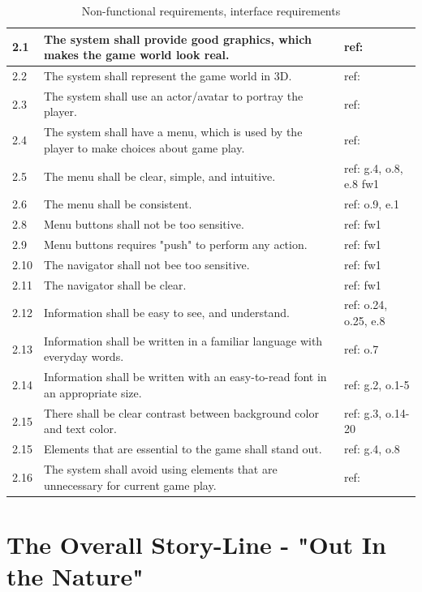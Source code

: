\begin{table} [H]
\centering
\begin{tabular}{|>{\raggedright}p{}|p{}|p{2cm}|} 
\hline
2.1 & The system shall provide good graphics, which makes the game world look real. & ref: \cite{understandingvg} \\ \hline
2.2 & The system shall represent the game world in 3D. & ref: \cite{understandingvg}\\ \hline
2.3 & The system shall use an actor/avatar to portray the player. & ref: \cite{understandingvg}\\ \hline
2.4 & The system shall have a menu, which is used by the player to make choices about game play. & ref: \cite{gerling2} \\ \hline
2.5 & The menu shall be clear, simple, and intuitive. & ref: g.4, o.8, e.8 fw1 \\ \hline
2.6 & The menu shall be consistent. & ref: o.9, e.1 \\ \hline
2.8 & Menu buttons shall not be too sensitive. & ref: fw1 \\ \hline
2.9 & Menu buttons requires "push" to perform any action. & ref: fw1\\ \hline
2.10 & The navigator shall not bee too sensitive. & ref: fw1\\ \hline
2.11 & The navigator shall be clear. & ref: fw1\\ \hline
2.12 & Information shall be easy to see, and understand. & ref: o.24, o.25, e.8\\ \hline
2.13 & Information shall be written in a familiar language with everyday words. & ref: o.7\\ \hline
2.14 & Information shall be written with an easy-to-read font in an appropriate size. & ref: g.2, o.1-5 \\ \hline
2.15 & There shall be clear contrast between background color and text color. & ref: g.3, o.14-20 \\ \hline
2.15 & Elements that are essential to the game shall stand out. & ref: g.4, o.8\\ \hline
2.16 & The system shall avoid using elements that are unnecessary for current game play.  & ref: \cite{sweetser}\\ \hline
\end{tabular}
\caption[Non-functional requirements]{Non-functional requirements, interface requirements}
\label{tab:nfunc}
\end{table} 

\section{The Overall Story-Line - "Out In the Nature"}
\label{sec:outinthenature}

